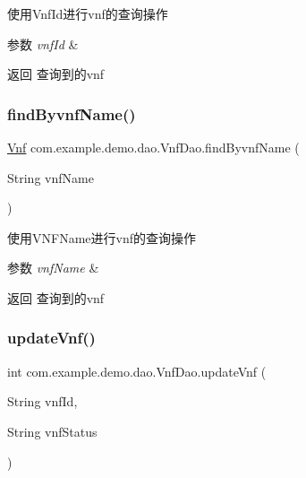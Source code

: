 使用\+Vnf\+Id进行vnf的查询操作 
\begin{DoxyParams}{参数}
{\em vnf\+Id} & \\
\hline
\end{DoxyParams}
\begin{DoxyReturn}{返回}
查询到的vnf 
\end{DoxyReturn}
\mbox{\label{interfacecom_1_1example_1_1demo_1_1dao_1_1_vnf_dao_acf520215feea51495bceb2d619b43fcd}} 
\subsubsection{\texorpdfstring{find\+Byvnf\+Name()}{findByvnfName()}}
{\footnotesize\ttfamily \mbox{\hyperlink{classcom_1_1example_1_1demo_1_1modular_1_1_vnf}{Vnf}} com.\+example.\+demo.\+dao.\+Vnf\+Dao.\+find\+Byvnf\+Name (\begin{DoxyParamCaption}\item[{String}]{vnf\+Name }\end{DoxyParamCaption})}

使用\+V\+N\+F\+Name进行vnf的查询操作 
\begin{DoxyParams}{参数}
{\em vnf\+Name} & \\
\hline
\end{DoxyParams}
\begin{DoxyReturn}{返回}
查询到的vnf 
\end{DoxyReturn}
\mbox{\label{interfacecom_1_1example_1_1demo_1_1dao_1_1_vnf_dao_aa7ad37f04a3a5eae0a9d2fc40606d44d}} 
\subsubsection{\texorpdfstring{update\+Vnf()}{updateVnf()}}
{\footnotesize\ttfamily int com.\+example.\+demo.\+dao.\+Vnf\+Dao.\+update\+Vnf (\begin{DoxyParamCaption}\item[{String}]{vnf\+Id,  }\item[{String}]{vnf\+Status }\end{DoxyParamCaption})}

